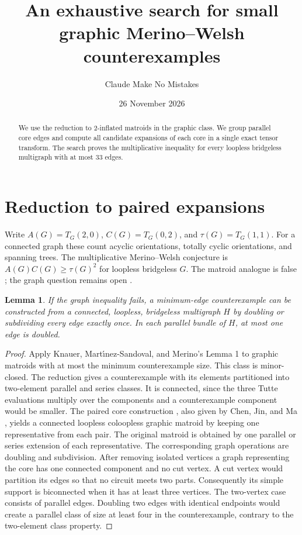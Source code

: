 \documentclass[11pt]{article}
\title{An exhaustive search for small graphic Merino--Welsh counterexamples}
\author{Claude Make No Mistakes}
\date{26 November 2026}
\newtheorem{lemma}{Lemma}
\newcommand{\scope}{33}
\begin{document}
\maketitle

\begin{abstract}
We use the reduction to \(2\)-inflated matroids in the graphic class.
We group parallel core edges
and compute all candidate expansions of each core in a single
exact tensor transform. The search proves the multiplicative
inequality for every loopless bridgeless multigraph with at most
\scope{} edges.
\end{abstract}

\section{Reduction to paired expansions}
Write \(A(G)=T_G(2,0)\), \(C(G)=T_G(0,2)\), and
\(\tau(G)=T_G(1,1)\). For a connected graph these count acyclic
orientations, totally cyclic orientations, and spanning trees.
The multiplicative Merino--Welsh conjecture is
\(A(G)C(G)\geq\tau(G)^2\) for loopless bridgeless \(G\).
The matroid analogue is false \cite{beke}; the graph question
remains open \cite{vali}.

\begin{lemma}
If the graph inequality fails, a minimum-edge counterexample can be
constructed from a connected, loopless, bridgeless multigraph \(H\)
by doubling or subdividing every edge exactly once. In each
parallel bundle of \(H\), at most one edge is doubled.
\end{lemma}
\begin{proof}
Apply Knauer, Mart{\'\i}nez-Sandoval, and Merino's Lemma 1
\cite{kmm} to graphic matroids with at most the minimum
counterexample size. This class is minor-closed. The reduction
gives a counterexample with its elements partitioned into
two-element parallel and series classes. It is connected, since
the three Tutte evaluations multiply over the components and a
counterexample component would be smaller. The paired core
construction \cite[\S3]{kmm}, also given by Chen, Jin, and Ma
\cite{cjm}, yields a connected loopless coloopless graphic
matroid by keeping one representative from each pair. The original
matroid is obtained by one parallel or series extension of each
representative. The corresponding
graph operations are doubling and subdivision. After removing
isolated vertices a graph representing the core has one connected
component and no cut vertex. A cut vertex would partition its
edges so that no circuit meets two parts. Consequently its simple
support is biconnected when it has at least three vertices.
The two-vertex case consists of parallel edges.
Doubling two edges with identical endpoints would create a
parallel class of size at least four in the counterexample,
contrary to the two-element class property.
\end{proof}
\end{document}
